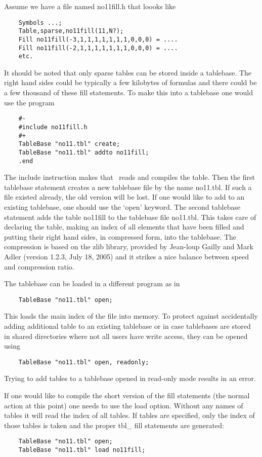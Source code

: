 Assume we have a file named no11fill.h that loooks like
\begin{verbatim}
    Symbols ...;
    Table,sparse,no11fill(11,N?);
    Fill no11fill(-3,1,1,1,1,1,1,1,0,0,0) = ....
    Fill no11fill(-2,1,1,1,1,1,1,1,0,0,0) = ....
    etc.
\end{verbatim}
It should be noted that only sparse tables can be stored 
inside a tablebase. The right hand sides could be typically a few kilobytes 
of formulas and there could be a few thousand of these fill statements. To 
make this into a tablebase one would use the program
\begin{verbatim}
    #-
    #include no11fill.h
    #+
    TableBase "no11.tbl" create;
    TableBase "no11.tbl" addto no11fill;
    .end
\end{verbatim}
The include instruction makes that \FORM\ reads and compiles 
the table. Then the first tablebase statement creates a new tablebase file 
by the name no11.tbl. If such a file existed already, the old version will 
be lost. If one would like to add to an existing tablebase, one should use 
the `open' keyword. The second tablebase statement adds the 
table no11fill to the tablebase file no11.tbl. This takes care of declaring 
the table, making an index of all elements that have been filled and 
putting their right hand sides, in compressed form, into the tablebase. The 
compression is based on the zlib library, provided by Jean-loup 
Gailly and Mark Adler (version 
1.2.3, July 18, 2005) and it strikes a nice balance between speed and 
compression ratio.

The tablebase can be loaded in a different program as in
\begin{verbatim}
    TableBase "no11.tbl" open;
\end{verbatim}
This loads the main index of the file into memory.
To protect against accidentally adding additional table to an existing
tablebase or in case tablebases are stored in shared directories where
not all users have write access, they can be opened using
\begin{verbatim}
    TableBase "no11.tbl" open, readonly;
\end{verbatim}
Trying to add tables to a tablebase opened in read-only mode results in an
error.

If one would like to compile the short version of the fill statements (the 
normal action at this point) one needs to use the load option. 
Without any names of tables it will read the index of all tables. If tables 
are specified, only the index of those tables is taken and the proper 
tbl\_ fill statements are generated:
\begin{verbatim}
    TableBase "no11.tbl" open;
    TableBase "no11.tbl" load no11fill;
\end{verbatim}

